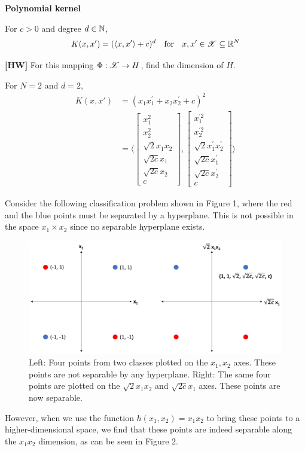 \documentclass[a4paper,english,12pt]{article}
\begin{document}
\begin{exmp}
	\textbf{Polynomial kernel}
	
For $c>0$ and degree $d \in \mathbb{N}$,
\[K(x,x') = (\langle x, x' \rangle + c)^d ~~~ \text{for} ~~~ x,x' \in \mathscr{X} \subseteq \mathbb{R}^N\]

\textbf{[HW]} For this mapping $\Phi: \mathscr{X} \rightarrow H$, find the dimension of $H$.

For $N=2$ and $d=2$,
\begin{align*}
K(x,x') &= (x_1 x_1^{'} + x_2 x_2^{'} + c)^2 \\
&= \langle
\begin{bmatrix}
x_1^2 \\
x_2^2 \\
\sqrt{2} x_1 x_2 \\
\sqrt{2c} x_1 \\
\sqrt{2c} x_2 \\
c
\end{bmatrix}
,
\begin{bmatrix}
x_1^{'2} \\
x_2^{'2} \\
\sqrt{2} x_1^{'} x_2^{'} \\
\sqrt{2c} x_1^{'} \\
\sqrt{2c} x_2^{'} \\
c
\end{bmatrix}
\rangle
\end{align*}

Consider the following classification problem shown in Figure 1, where the red and the blue points must be separated by a hyperplane. This is not possible in the space $x_1 \times x_2$ since no separable hyperplane exists. 

\begin{figure}[h]
	\includegraphics[scale=0.5]{kernel-methods-polynomial-kernel}
	\centering
	\caption{Left: Four points from two classes plotted on the $x_1, x_2$ axes. These points are not separable by any hyperplane. Right: The same four points are plotted on the $\sqrt{2} x_1 x_2$ and $\sqrt{2c} x_1$ axes. These points are now separable.}
\end{figure}
However, when we use the function $h(x_1,x_2) = x_1 x_2$ to bring these points to a higher-dimensional space, we find that these points are indeed separable along the $x_1 x_2$ dimension, as can be seen in Figure 2.

\end{exmp}
\end{document}
